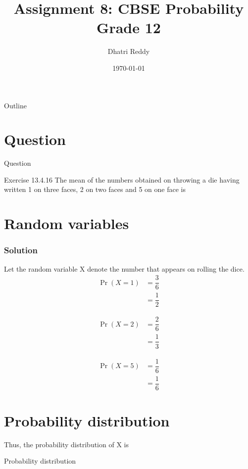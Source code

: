 \documentclass{beamer}
\title{Assignment 8: CBSE Probability Grade 12 }
\author{Dhatri Reddy}
\date{\today}
\providecommand{\pr}[1]{\ensuremath{\Pr\left(#1\right)}}
\begin{document}
\begin{frame}
    \titlepage 
\end{frame}

\logo{}

\begin{frame}{Outline}
    \tableofcontents
\end{frame}

\section{Question}
\begin{frame}{Question}
    \begin{block}{Exercise 13.4.16}
        The mean of the numbers obtained on throwing a die having written 1 on three faces, 2 on two faces and 5 on one face is
    \end{block}
\end{frame}

\section{Random variables}
\begin{frame}
\frametitle{Solution}
Let the random variable X denote the number that appears on rolling the dice.
\begin{align}
    \pr{X=1} &= \dfrac{3}{6}\\
    &= \dfrac{1}{2}
\end{align}

\begin{align}
    \pr{X=2} &= \dfrac{2}{6}\\
    &= \dfrac{1}{3}
\end{align}

\begin{align}
    \pr{X=5} &= \dfrac{1}{6}\\
    &= \dfrac{1}{6}
\end{align}
\end{frame}

\section{{Probability distribution}}
\begin{frame}

Thus, the probability distribution of X is 
    \begin{table}[ht!]
\centering
	
	\vspace*{5pt}
\caption{Probability distribution}
	\label{table:table-1}
\end{table}
\end{frame}
\end{document}
